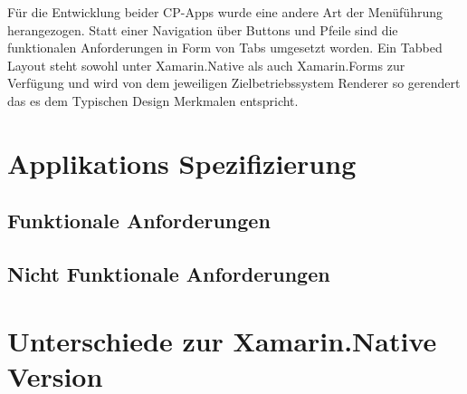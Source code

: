 	Für die Entwicklung beider CP-Apps wurde eine andere Art der Menüführung herangezogen. Statt einer Navigation über Buttons und Pfeile sind die funktionalen Anforderungen in Form von Tabs umgesetzt worden. Ein Tabbed Layout steht sowohl unter Xamarin.Native als auch Xamarin.Forms zur Verfügung und wird von dem jeweiligen Zielbetriebssystem Renderer so gerendert das es dem Typischen Design Merkmalen entspricht.

\section{Applikations Spezifizierung}
\label{sec:mckspecs}

\subsection{Funktionale Anforderungen}
\label{sec:mckbfunkcspecs}

\subsection{Nicht Funktionale Anforderungen}
\label{sec:mckbnonfuncspecs}

\section{Unterschiede zur Xamarin.Native Version}
\label{sec:mckbspecs}